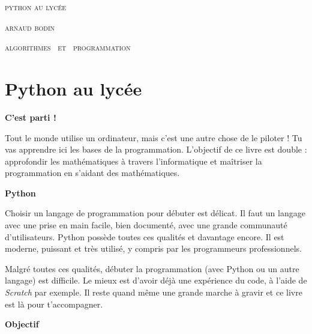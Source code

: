 
\pagestyle{empty}\thispagestyle{empty}
\vspace*{\fill}
\vspace*{5ex}
\begin{center}
\fontsize{52}{52}\selectfont
\textsc{python au lycée}

\vspace*{1ex}

\huge
\textsc{arnaud bodin}
\end{center}
\vfill
\begin{center}
\huge
\textsc{algorithmes \  et \  programmation}
\end{center}
\begin{center}
\end{center}
\clearemptydoublepage

\thispagestyle{empty}

\vspace*{\fill}
\section*{Python au lycée}

{\large\textbf{C'est parti !}}

Tout le monde utilise un ordinateur, mais c'est une autre chose de le piloter ! Tu vas apprendre ici les bases de la programmation.  L'objectif de ce livre est double :  approfondir les mathématiques à travers l'informatique et maîtriser la programmation en s'aidant des mathématiques. 

\bigskip

{\large\textbf{Python}}

Choisir un langage de programmation pour débuter est délicat. Il faut un langage avec une prise en main facile, bien documenté, avec une grande communauté d'utilisateurs. Python possède toutes ces qualités et davantage encore. Il est moderne, puissant et très utilisé, y compris par les programmeurs professionnels. 

Malgré toutes ces qualités, débuter la programmation (avec Python ou un autre langage) est difficile. Le mieux est d'avoir déjà une expérience du code, à l'aide de \emph{Scratch} par exemple. Il reste quand même une grande marche à gravir et ce livre est là pour t'accompagner.

\bigskip

{\large\textbf{Objectif}}

